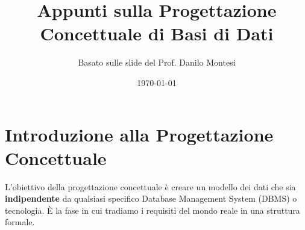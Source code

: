 

\usepackage{hyperref}


\title{Appunti sulla Progettazione Concettuale di Basi di Dati}
\author{Basato sulle slide del Prof. Danilo Montesi}
\date{\today}


	
	\maketitle
	\tableofcontents
	\newpage
	
	\section{Introduzione alla Progettazione Concettuale}
	L'obiettivo della progettazione concettuale è creare un modello dei dati che sia \textbf{indipendente} da qualsiasi specifico Database Management System (DBMS) o tecnologia. È la fase in cui tradiamo i requisiti del mondo reale in una struttura formale.
	
